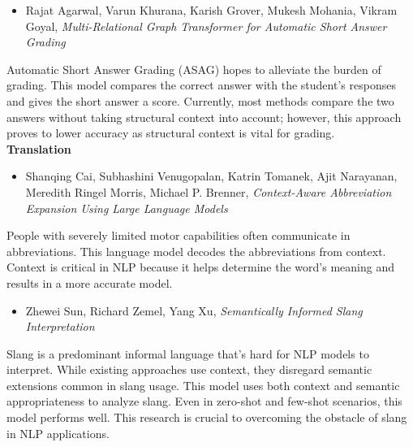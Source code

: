 \documentclass[11pt]{article}
\begin{document}
\begin{itemize}
\item Rajat Agarwal, Varun Khurana, Karish Grover, Mukesh Mohania, Vikram Goyal, \emph{Multi-Relational Graph Transformer for Automatic Short Answer Grading}
\end{itemize}
Automatic Short Answer Grading (ASAG) hopes to alleviate the burden of grading. This model compares the correct answer with the student’s responses and gives the short answer a score. Currently, most methods compare the two answers without taking structural context into account; however, this approach proves to lower accuracy as structural context is vital for grading. 
\\[12pt]
\noindent
\textbf{Translation}
\begin{itemize}
\item Shanqing Cai, Subhashini Venugopalan, Katrin Tomanek, Ajit Narayanan, Meredith Ringel Morris, Michael P. Brenner, \emph{Context-Aware Abbreviation Expansion Using Large Language Models}
\end{itemize}
People with severely limited motor capabilities often communicate in abbreviations. This language model decodes the abbreviations from context. Context is critical in NLP because it helps determine the word's meaning and results in a more accurate model. 

\begin{itemize}
\item Zhewei Sun, Richard Zemel, Yang Xu, \emph{Semantically Informed Slang Interpretation}
\end{itemize}
Slang is a predominant informal language that’s hard for NLP models to interpret. While existing approaches use context, they disregard semantic extensions common in slang usage. This model uses both context and semantic appropriateness to analyze slang. Even in zero-shot and few-shot scenarios, this model performs well. This research is crucial to overcoming the obstacle of slang in NLP applications. 
\end{document}

